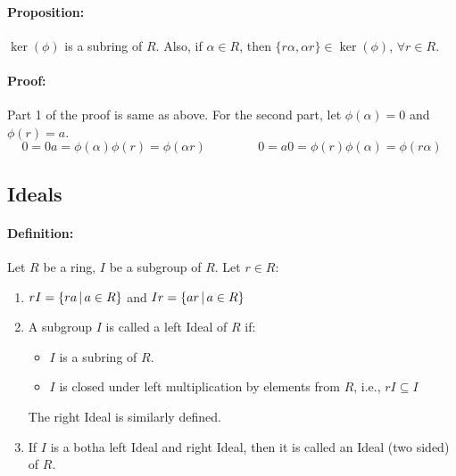 \documentclass[12pt, oneside]{book}
\begin{document}
\paragraph{Proposition:} \(\ker(\phi)\) is a subring of \(R\).
Also, if \(\alpha \in R\), then \(\{r \alpha, \alpha r\} \in \ker(\phi)\), \(\forall r \in R\).
\paragraph{Proof:} Part 1 of the proof is same as above.
For the second part, let \(\phi(\alpha) = 0\) and \(\phi(r) = a\).
\[0 = 0 a = \phi(\alpha)\phi(r) = \phi(\alpha r) \hspace{50pt} 0 = a0 = \phi(r) \phi(\alpha) = \phi(r \alpha)\]

\subsection{Ideals}
\paragraph{Definition:} Let \(R\) be a ring, \(I\) be a subgroup of \(R\). Let \(r \in R\):
\begin{enumerate}
    \item \(rI = \{ra \; \vline \; a \in R\}\) and \(Ir = \{ar \; \vline \; a \in R\}\) 
    \item A subgroup \(I\) is called a left Ideal of \(R\) if:
    \begin{itemize}
        \item \(I\) is a subring of \(R\).
        \item \(I\) is closed under left multiplication by elements from \(R\), i.e., \(rI \subseteq I\)
    \end{itemize}
    The right Ideal is similarly defined.
    \item If \(I\) is a botha left Ideal and right Ideal, then it is called an Ideal (two sided) of \(R\).
\end{enumerate}
\end{document}
